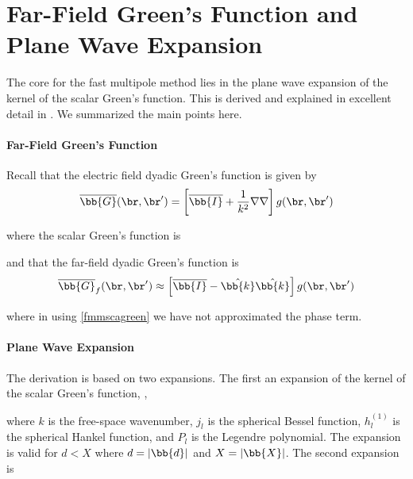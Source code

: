 


\section{Far-Field Green's Function and Plane Wave Expansion}

The core for the fast multipole method lies in the plane wave expansion of the kernel of the scalar Green's function.  This is derived and explained in excellent detail in \cite{yucel2008helmholtz}. We summarized the main points here.

\paragraph{Far-Field Green's Function}

Recall that the electric field dyadic Green's function is given by
\begin{equation}
 \overline{\bb{G}}(\br,\br') = \left[\overline{\bb{I}} + \dfrac{1}{k^2} \nabla\nabla \right] g(\br,\br') 
 \end{equation}
 
\noindent where the scalar Green's function is 

\noindent and that the far-field dyadic Green's function is
\begin{equation}
 \overline{\bb{G}}_f(\br,\br') \approx \left[\overline{\bb{I}} - \hat{\bb{k}} \hat{\bb{k}} \right] g(\br,\br') 
 \end{equation}
 
 \noindent where in using \eqref{fmmscagreen} we have not approximated the phase term. 


\paragraph{Plane Wave Expansion}

The derivation is based on two expansions. The first an expansion of the kernel of the scalar Green's function, \cite{yucel2008helmholtz}, 

\noindent where $k$ is the free-space wavenumber, $j_l$ is the spherical Bessel function, $h_l^{(1)}$ is the spherical Hankel function, and $P_l$ is the Legendre polynomial. The expansion is valid for $d < X$ where $d = \vert \bb{d} \vert$ and $X = \vert \bb{X} \vert$. The second expansion is 

